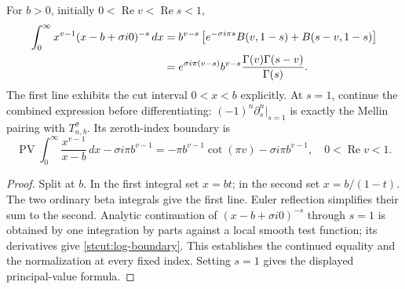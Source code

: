\begin{proposition}
\label{stcut:beta}
For $b>0$, initially $0<\operatorname{Re}v<\operatorname{Re}s<1$,
\begin{align}
 \int_0^\infty x^{v-1}(x-b+\sigma i0)^{-s}\,dx
 &=b^{v-s}\left[e^{-\sigma i\pi s}B(v,1-s)
                        +B(s-v,1-s)\right]\notag\\
 &=e^{\sigma i\pi(v-s)}b^{v-s}
                     \frac{\Gamma(v)\Gamma(s-v)}{\Gamma(s)}.
 \label{stcut:beta-kernel}
\end{align}
The first line exhibits the cut interval $0<x<b$ explicitly. At
$s=1$, continue the combined expression before differentiating:
$(-1)^n\partial_s^n|_{s=1}$ is exactly the Mellin pairing with
$T_{n,b}^{\sigma}$. Its zeroth-index boundary is
\begin{equation}\label{stcut:pole-Mellin}
 \operatorname{PV}\int_0^\infty\frac{x^{v-1}}{x-b}\,dx
 -\sigma i\pi b^{v-1}
 =-\pi b^{v-1}\cot(\pi v)-\sigma i\pi b^{v-1},
 \quad0<\operatorname{Re}v<1.
\end{equation}
\end{proposition}
\begin{proof}
Split at $b$. In the first integral set $x=bt$; in the second set
$x=b/(1-t)$. The two ordinary beta integrals give the first line.
Euler reflection simplifies their sum to the second. Analytic
continuation of $(x-b+\sigma i0)^{-s}$ through $s=1$ is obtained
by one integration by parts against a local smooth test function;
its derivatives give \eqref{stcut:log-boundary}. This establishes
the continued equality and the normalization at every fixed index.
Setting $s=1$ gives the displayed principal-value formula.
\end{proof}

